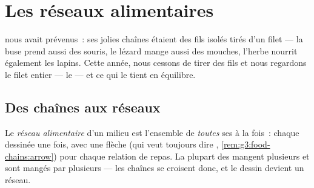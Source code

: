 \chapter{Les réseaux alimentaires}\label{ch:g5:food-webs}

 nous avait prévenus~: ses jolies chaînes
étaient des fils isolés tirés d'un filet --- la buse prend aussi des
souris, le lézard mange aussi des mouches, l'herbe nourrit également
les lapins. Cette année, nous cessons de tirer des fils et nous
regardons le filet entier --- le  --- et ce qui le
tient en équilibre.

\section{Des chaînes aux réseaux}

\begin{definition}\label{def:g5:food-webs:web}
Le \emph{réseau alimentaire} d'un milieu
est l'ensemble de \emph{toutes} ses  à la fois~:
chaque  dessinée une fois, avec une flèche (qui veut toujours
dire \emph{},
\cref{rem:g3:food-chains:arrow}) pour chaque relation de repas. La
plupart des  mangent plusieurs  et sont mangés par
plusieurs --- les chaînes se croisent donc, et le dessin devient un
réseau.
\end{definition}

